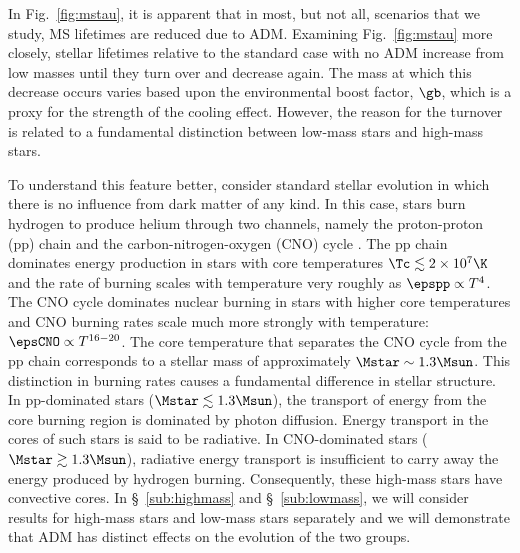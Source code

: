   In Fig.~\ref{fig:mstau},
  it is apparent that in most, but not all, scenarios that we study, MS lifetimes are reduced due to ADM.
  Examining Fig.~\ref{fig:mstau} more closely, stellar lifetimes relative to the standard case with no
  ADM increase from low masses until they turn over and decrease again. The mass at which this decrease
  occurs varies based upon the environmental boost factor, $\gb$, which is a proxy for the strength of the
  cooling effect. However, the reason for the turnover is related to a fundamental distinction between
  low-mass stars and high-mass stars.  

  To understand this feature better, consider standard stellar evolution in which there is no influence from
  dark matter of any kind. In this case, stars burn hydrogen to produce helium through two channels, namely
  the proton-proton (pp) chain and the carbon-nitrogen-oxygen (CNO) cycle
  . The pp chain dominates energy
  production in stars with core temperatures $\Tc \lesssim 2 \times 10^7 \K$ and the
  rate of burning scales with temperature very roughly as $\epspp \propto T^4$. The CNO
  cycle dominates nuclear burning in stars with higher core temperatures and CNO burning rates scale
  much more strongly with temperature: $\epsCNO \propto T^{16-20}$. The core temperature
  that separates the CNO cycle from the pp chain corresponds to a stellar mass of approximately
  $\Mstar \sim 1.3 \Msun$. This distinction in burning rates causes a fundamental
  difference in stellar structure. In pp-dominated stars ($\Mstar \lesssim 1.3 \Msun$),
  the transport of energy from the core burning region
  is dominated by photon diffusion. Energy transport in the cores of such stars
  is said to be radiative. In CNO-dominated stars ($\Mstar \gtrsim 1.3 \Msun$),
  radiative energy transport is insufficient to carry away the energy produced by hydrogen burning.
  Consequently, these high-mass stars have convective cores. In \S~\ref{sub:highmass} and \S~\ref{sub:lowmass}, we will consider
  results for high-mass stars and low-mass stars separately and we will demonstrate that ADM
  has distinct effects on the evolution of the two groups.

